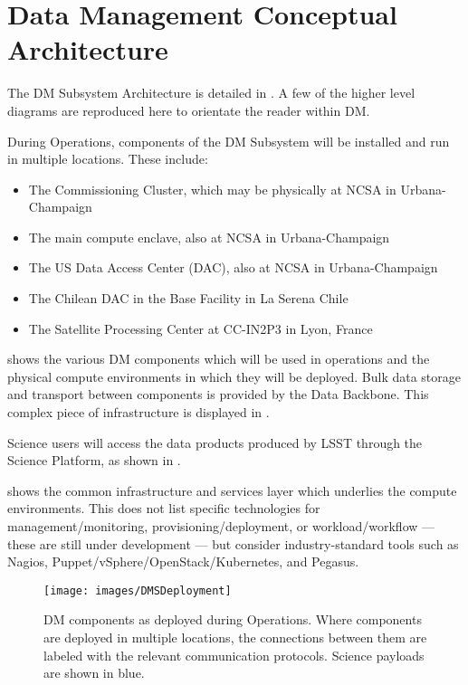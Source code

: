 \section{Data Management Conceptual Architecture \label{sect:dmarc}}

The DM Subsystem Architecture is detailed in .
A few of the higher level diagrams are reproduced here to orientate the reader within DM.

During Operations, components of the DM Subsystem will be installed and run in
multiple locations. These include:

\begin{itemize}
\item The Commissioning Cluster, which may be physically at NCSA in Urbana-Champaign
\item The main compute enclave, also at NCSA in Urbana-Champaign
\item The US Data Access Center (DAC), also at NCSA in Urbana-Champaign
\item The Chilean DAC in the Base Facility in La Serena Chile
\item The Satellite Processing Center at CC-IN2P3 in Lyon, France
\end{itemize}

 shows the various DM components which will be used in operations and the physical compute environments in which they will be deployed.
Bulk data storage and transport between components is provided by the Data Backbone. This complex piece of infrastructure is displayed in .

Science users will access the data products produced by LSST through the
Science Platform, as shown in .

 shows the common infrastructure and services layer which underlies the compute environments.
This does not list specific technologies for management/monitoring, provisioning/deployment, or workload/workflow --- these are still under development --- but consider industry-standard tools such as Nagios, Puppet/vSphere/OpenStack/Kubernetes, and Pegasus.

\begin{figure}[htbp]
\begin{center}
\texttt{[image: images/DMSDeployment]}
\caption{DM components as deployed during Operations. Where components are
deployed in multiple locations, the connections between them are labeled with
the relevant communication protocols. Science payloads are shown in blue.
\label{fig:dmsdeploy}}
\end{center}
\end{figure}

